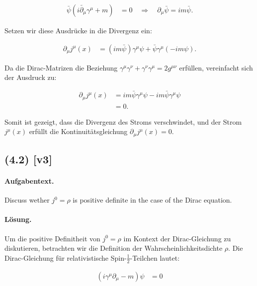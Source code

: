 \documentclass[11pt,a4paper]{article}
\begin{document}
\begin{align*}
\bar{\psi} (i \overleftarrow{\partial_\mu} \gamma^\mu + m) &= 0 \quad \Rightarrow \quad \partial_\mu \bar{\psi} = i m \bar{\psi}.
\end{align*}

Setzen wir diese Ausdrücke in die Divergenz ein:

\begin{align*}
\partial_\mu j^\mu(x) &= (i m \bar{\psi}) \gamma^\mu \psi + \bar{\psi} \gamma^\mu (-i m \psi).
\end{align*}

Da die Dirac-Matrizen die Beziehung \(\gamma^\mu \gamma^\nu + \gamma^\nu \gamma^\mu = 2g^{\mu\nu}\) erfüllen, vereinfacht sich der Ausdruck zu:

\begin{align*}
\partial_\mu j^\mu(x) &= i m \bar{\psi} \gamma^\mu \psi - i m \bar{\psi} \gamma^\mu \psi \\
&= 0.
\end{align*}

Somit ist gezeigt, dass die Divergenz des Stroms verschwindet, und der Strom \( j^\mu(x) \) erfüllt die Kontinuitätsgleichung \(\partial_\mu j^\mu(x) = 0\).


\subsection*{(4.2) [v3]}
\paragraph{Aufgabentext.}
Discuss wether $j^0=\rho$ is positive definite in the case of the Dirac equation.

\paragraph{Lösung.}
Um die positive Definitheit von $j^0 = \rho$ im Kontext der Dirac-Gleichung zu diskutieren, betrachten wir die Definition der Wahrscheinlichkeitsdichte $\rho$. Die Dirac-Gleichung für relativistische Spin-$\frac{1}{2}$-Teilchen lautet:

\begin{align*}
(i\gamma^\mu \partial_\mu - m)\psi &= 0
\end{align*}
\end{document}
